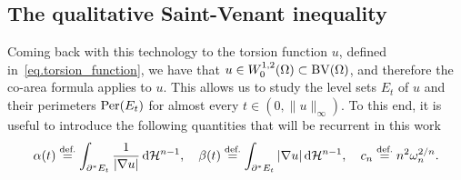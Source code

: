 \documentclass[11pt]{amsart}
\theoremstyle{plain}
\theoremstyle{definition}
\newcommand{\dHn}{\,\dd\mathcal{H}^{n-1}}
\newcommand{\eqdef}{\overset{\text{def.}}{=}}
\def\dd{{\rm d}}
\newcommand\BV{\mathop{\rm BV}}
\newcommand\Per{\mathop{\rm Per}}
\begin{document}
\subsection{The qualitative Saint-Venant inequality}\label{sec.qualitative_SV}
Coming back with this technology to the torsion function $u$, defined in~\eqref{eq.torsion_function}, we have that $u \in W_0^{1,2}(\Omega) \subset \BV(\Omega)$, and therefore the co-area formula applies to $u$. This allows us to study the level sets $E_t$ of $u$ and their perimeters $\Per(E_t)$ for almost every $t \in (0, \|u\|_\infty)$. To this end, it is useful to introduce the following quantities that will be recurrent in this work
\[
  \alpha(t)\eqdef \int_{\partial^*E_t}\frac{1}{|\nabla u|}\dHn,\quad
  \beta(t)\eqdef\int_{\partial^*E_t}|\nabla u|\dHn,\quad
  c_n\eqdef n^2\omega_n^{2/n}.
\]
\end{document}
